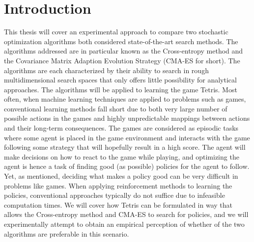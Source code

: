 \section{Introduction \label{sec:intro}}

This thesis will cover an experimental approach 
to compare two stochastic optimization algorithms both considered 
state-of-the-art search methods. The algorithms addressed
are in particular known as the Cross-entropy method and 
the Covariance Matrix Adaption Evolution Strategy (CMA-ES
for short). The algorithms are each characterized by their
ability to search in rough multidimensional 
search spaces that only offers little possibility 
for analytical approaches.
The algorithms will be applied to 
learning the game Tetris. Most often, when machine learning
techniques are applied to problems such as games, conventional
learning methods fall short due to both  very large number of 
possible actions in the games and highly unpredictable mappings 
between actions and their long-term consequences. The games 
are considered as episodic tasks where some agent is placed
in the game environment and interacts with the game following some
strategy that will hopefully result in a high score. 
The agent will make decisions on how to react 
to the game while playing, and optimizing the agent is hence a task of
finding good (as possible) policies for the agent to follow. Yet, as mentioned,
deciding what makes a policy good can be very difficult in
problems like games. When applying reinforcement methods to learning
the policies, conventional approaches typically do not suffice 
due to infeasible computation times. We will cover how
Tetris can be formulated in way that allows  the Cross-entropy method 
and CMA-ES to search for policies, and we will experimentally 
attempt to obtain an empirical perception of whether of the two algorithms
are preferable in this scenario.










